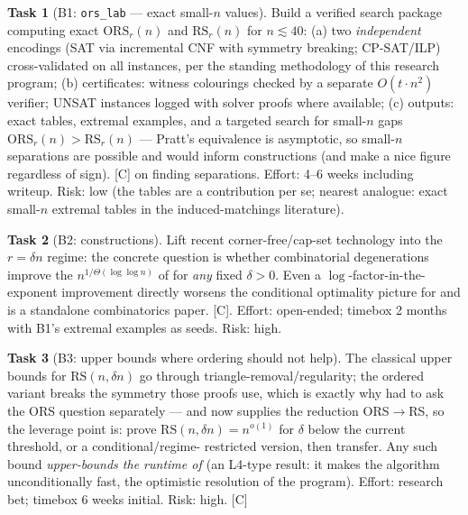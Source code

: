 \documentclass[11pt]{article}
\theoremstyle{definition}
\newtheorem{task}{Task}
\theoremstyle{remark}
\newcommand{\statusC}{\textcolor{red!70!black}{\textsf{[C]}}}
\newcommand{\ORS}{\mathrm{ORS}}
\newcommand{\RS}{\mathrm{RS}}
\begin{document}
\begin{task}[B1: \texttt{ors\_lab} --- exact small-$n$ values]
\label{task:orslab}
Build a verified search package computing exact $\ORS_r(n)$ and
$\RS_r(n)$ for $n\lesssim 40$:
(a) two \emph{independent} encodings (SAT via incremental CNF with
symmetry breaking; CP-SAT/ILP) cross-validated on all instances, per
the standing methodology of this research program;
(b) certificates: witness colourings checked by a separate
$O(t\cdot n^2)$ verifier; UNSAT instances logged with solver proofs
where available;
(c) outputs: exact tables, extremal examples, and a targeted search for
small-$n$ gaps $\ORS_r(n)>\RS_r(n)$ --- Pratt's equivalence is
asymptotic, so small-$n$ separations are possible and would inform
constructions (and make a nice figure regardless of sign). \statusC{}
on finding separations. Effort: 4--6 weeks including writeup. Risk: low
(the tables are a contribution per se; nearest analogue: exact
small-$n$ extremal tables in the induced-matchings literature).
\end{task}

\begin{task}[B2: constructions]\label{task:construct}
Lift recent corner-free/cap-set technology \cite{CFTZ22,BCCGNSU17} into
the $r=\delta n$ regime: the concrete question is whether combinatorial
degenerations improve the $n^{1/\Theta(\log\log n)}$ of \cite{FLNRRS02}
for \emph{any} fixed $\delta>0$. Even a $\log$-factor-in-the-exponent
improvement directly worsens the conditional optimality picture for
\cite{AKK25} and is a standalone combinatorics paper. \statusC.
Effort: open-ended; timebox 2 months with B1's extremal examples as
seeds. Risk: high.
\end{task}

\begin{task}[B3: upper bounds where ordering should not help]
\label{task:upper}
The classical upper bounds for $\RS(n,\delta n)$ go through
triangle-removal/regularity; the ordered variant breaks the symmetry
those proofs use, which is exactly why \cite{BG24} had to ask the ORS
question separately --- and \cite{Pra26} now supplies the reduction
ORS$\to$RS, so the leverage point is: prove $\RS(n,\delta n)=n^{o(1)}$
for $\delta$ below the current threshold, or a conditional/regime-%
restricted version, then transfer. Any such bound \emph{upper-bounds the
runtime of \cite{AKK25}} (an L4-type result: it makes the algorithm
unconditionally fast, the optimistic resolution of the program). 
Effort: research bet; timebox 6 weeks initial. Risk: high. \statusC
\end{task}
\end{document}
